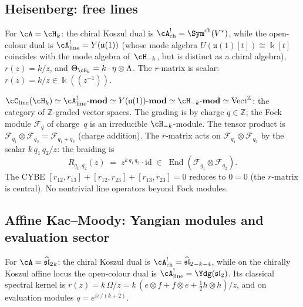 \subsection{Heisenberg: free lines}
\label{subsec:line-op-heisenberg}

For $\cA=\cH_k$: the chiral Koszul dual is
$\cA^!_{\mathrm{ch}}=\Sym^{\mathrm{ch}}(V^*)$, while the
open-colour dual is
$\cA^!_{\mathrm{line}}=Y(\mathfrak{u}(1))$
(whose mode algebra $U(\mathfrak{u}(1)[t]) \cong \Bbbk[t]$
coincides with the mode algebra of~$\cH_{-k}$,
but is distinct as a chiral algebra),
$r(z)=k/z$, and $\Theta_{\cH_k}=k\cdot\eta\otimes\Lambda$.
The $r$-matrix is scalar: $r(z)=k/z\in\Bbbk(\!(z^{-1})\!)$.

\begin{computation}
\label{comp:line-op-heisenberg}
$\cC_{\mathrm{line}}(\cH_k)
\simeq\cA^!_{\mathrm{line}}\text{-}\mathbf{mod}
\simeq Y(\mathfrak{u}(1))\text{-}\mathbf{mod}
\simeq\cH_{-k}\text{-}\mathbf{mod}
\simeq\mathrm{Vect}^{\mathbb Z}$:
the category of $\mathbb Z$-graded vector spaces. The
grading is by charge $q\in\mathbb Z$; the Fock module
$\mathcal F_q$ of charge~$q$ is an irreducible
$\cH_{-k}$-module. The tensor product is
$\mathcal F_{q_1}\otimes\mathcal F_{q_2}
=\mathcal F_{q_1+q_2}$
(charge addition). The $r$-matrix acts on
$\mathcal F_{q_1}\otimes\mathcal F_{q_2}$ by the scalar
$k\,q_1\,q_2/z$: the braiding is
\[
R_{q_1,q_2}(z)
\;=\;
z^{k\,q_1\,q_2}\cdot\mathrm{id}
\;\in\;
\operatorname{End}(\mathcal F_{q_1}\otimes\mathcal F_{q_2}).
\]
The CYBE $[r_{12},r_{13}]+[r_{12},r_{23}]+[r_{13},r_{23}]=0$
reduces to $0=0$ (the $r$-matrix is central).
No nontrivial line operators beyond Fock modules.
\end{computation}

\subsection{Affine Kac--Moody: Yangian modules and evaluation sector}
\label{subsec:line-op-affine}

For $\cA=\widehat{\mathfrak{sl}}_2{}_k$:
the chiral Koszul dual is
$\cA^!_{\mathrm{ch}}=\widehat{\mathfrak{sl}}_2{}_{-k-4}$,
while on the chirally Koszul affine locus the open-colour dual is
$\cA^!_{\mathrm{line}}=\Ydg(\mathfrak{sl}_2)$. Its classical
spectral kernel is
$r(z)=k\,\Omega/z=k\,(e\otimes f+f\otimes e+\tfrac12 h\otimes h)/z$,
and on evaluation modules
$q=e^{i\pi/(k+2)}$.

